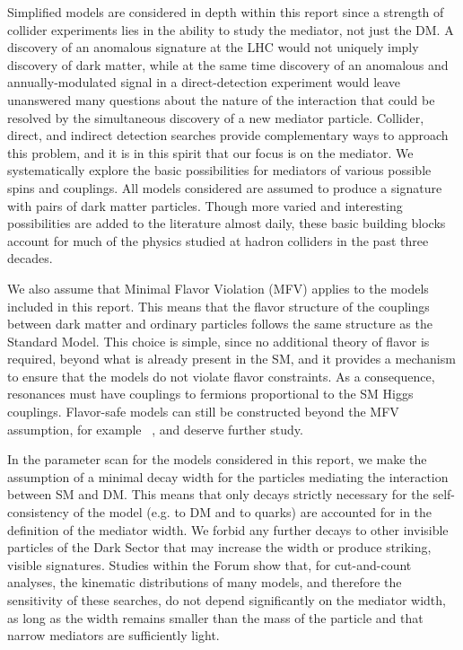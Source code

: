 Simplified models are considered in depth within this report since a strength of collider experiments lies in the ability to
study the mediator, not just the DM. A discovery of an
anomalous \MET signature
at the LHC would not uniquely imply discovery of dark matter, while at
the same time discovery of an anomalous and annually-modulated signal
in a direct-detection experiment would leave unanswered many questions
about the nature of the interaction that could be resolved by the simultaneous discovery
of a new mediator particle. 
Collider, direct, and indirect detection searches provide complementary ways to
approach this problem, and it is in this spirit that our focus is on
the mediator. We systematically explore the basic possibilities for
mediators of various possible spins and couplings.
All models considered are assumed to produce a signature with pairs of dark matter particles.
Though more varied and
interesting possibilities are added to the literature almost daily,
these basic building blocks account for much of the physics studied at
hadron colliders in the past three decades.

We also assume that Minimal Flavor Violation (MFV) \cite{Chivukula:1987py,Hall:1990ac,Buras:2000dm,D'Ambrosio:2002ex} applies to the
models included in this report. This means that the flavor structure of the
couplings between dark matter and ordinary particles follows the same
structure as the Standard Model. This choice is simple, since no
additional theory of flavor is required, beyond what is already
present in the SM, and it provides a mechanism to ensure that the
models do not violate flavor constraints.  As a consequence, \spinzero
resonances must have couplings to fermions proportional to the SM Higgs couplings. 
Flavor-safe models can still be constructed beyond the MFV
assumption, for example ~\cite{Agrawal:2014aoa}, and deserve further study.

In the parameter scan for the models considered in this report, we make the
assumption of a minimal decay width for the particles mediating the
interaction between SM and DM.  This means that only decays
strictly necessary for the self-consistency of the model (e.g.  to DM
and to quarks) are accounted for in the definition of the mediator
width. We forbid any further decays to other invisible particles of
the Dark Sector that may increase the width or produce striking, visible signatures. 
Studies within the Forum
show that, for cut-and-count analyses, the kinematic distributions of
many models, and therefore the sensitivity of these searches, do not depend
significantly on the mediator width, as long as the width remains smaller
than the mass of the particle and that narrow mediators are sufficiently light.

